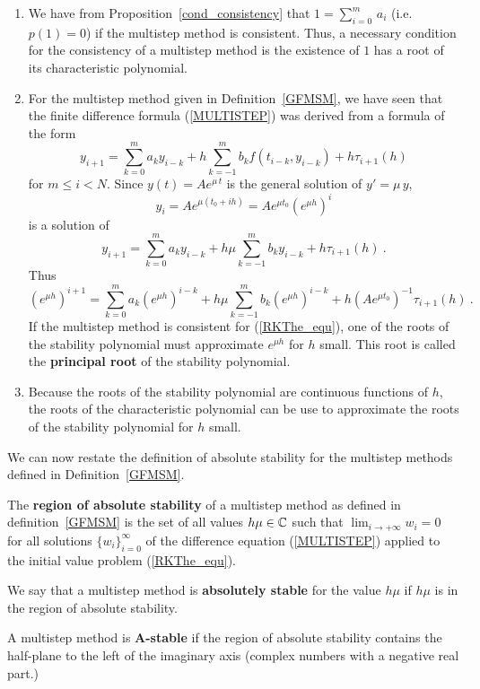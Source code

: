 \begin{rmkList}
\begin{enumerate}
\item We have from Proposition~\ref{cond_consistency} that
$\displaystyle 1 = \sum_{i=0}^m\,a_i$ (i.e.\ $p(1) = 0$) if the
multistep method is consistent.  Thus, a necessary condition for the
consistency of a multistep method is the existence of $1$ has a root
of its characteristic polynomial.
\item For the multistep method given in Definition~\ref{GFMSM}, we have
seen that the finite difference formula (\ref{MULTISTEP}) was derived
from a formula of the form
\[
y_{i+1} = \sum_{k=0}^m a_k y_{i-k} + h \sum_{k=-1}^m b_k
f(t_{i-k},y_{i-k}) + h \tau_{i+1}(h)
\]
for $m \leq i < N$.  Since $y(t) = A e^{\mu\, t}$ is the general solution of
$y' = \mu\,y$,
\[
y_i = A e^{\mu (t_0+ih)} = A e^{\mu t_0} \left( e^{\mu h}\right)^i
\]
is a solution of
\[
y_{i+1} = \sum_{k=0}^m a_k y_{i-k} + h \mu \sum_{k=-1}^m b_k
y_{i-k} + h \tau_{i+1}(h) \ .
\]
Thus
\[
\left( e^{\mu h}\right)^{i+1} = \sum_{k=0}^m a_k \left( e^{\mu h}\right)^{i-k}
+ h \mu \sum_{k=-1}^m b_k \left( e^{\mu h}\right)^{i-k}
+ h \left(A e^{\mu t_0}\right)^{-1} \tau_{i+1}(h) \ .
\]
If the multistep method is consistent for (\ref{RKThe_equ}), one of
the roots of the stability polynomial must approximate $e^{\mu h}$ for
$h$ small.  This root is called the
{\bfseries principal root} of
the stability polynomial. 
\item Because the roots of the stability polynomial are continuous
functions of $h$, the roots of the characteristic polynomial can be
use to approximate the roots of the stability polynomial for $h$
small.
\end{enumerate}
\end{rmkList}

We can now restate the definition of absolute stability for the
multistep methods defined in Definition~\ref{GFMSM}.

\begin{defn}
The {\bfseries region of absolute stability} of a multistep method as defined in
definition~\ref{GFMSM} is the set of all values $h\mu \in \mathbb{C}$
such that $\displaystyle \lim_{i\rightarrow +\infty} w_i = 0$ for all
solutions $\{w_i\}_{i=0}^\infty$ of the difference
equation (\ref{MULTISTEP}) applied to the initial value problem
(\ref{RKThe_equ}).

We say that a multistep method is
{\bfseries absolutely stable} for
the value $h\mu$ if $h\mu$ is in the region of absolute stability.

A multistep method is {\bfseries A-stable}
if the region of absolute stability contains the half-plane to the left of
the imaginary axis (complex numbers with a negative real part.)
\end{defn}

